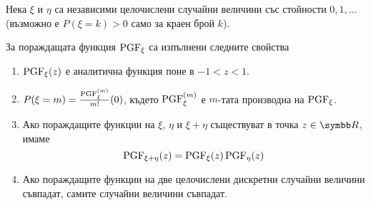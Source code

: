 \documentclass[numbers=endperiod, bibliography=totocnumbered]{scrartcl}
\begin{document}
\begin{theorem}\label{thm:pgf_properties}
  Нека \( \xi \) и \( \eta \) са независими целочислени случайни величини със стойности \( 0, 1, \ldots \) (възможно е \( P(\xi = k) > 0 \) само за краен брой \( k \)).

  За пораждащата функция \( \operatorname{PGF}_\xi \) са изпълнени следните свойства
  \begin{enumerate}
    \item \( \operatorname{PGF}_\xi(z) \) е аналитична функция поне в \( -1 < z < 1 \).
    \item \( P(\xi = m) = \frac {\operatorname{PGF}_\xi^{(m)}} {m!} (0) \), където \( \operatorname{PGF}_\xi^{(m)} \) е \( m \)-тата производна на \( \operatorname{PGF}_\xi \).
    \item Ако пораждащите функции на \( \xi \), \( \eta \) и \( \xi + \eta \) съществуват в точка \( z \in \R \), имаме
    \begin{equation*}
      \operatorname{PGF}_{\xi + \eta}(z) = \operatorname{PGF}_\xi(z) \operatorname{PGF}_\eta(z)
    \end{equation*}

    \item Ако пораждащите функции на две целочислени дискретни случайни величини съвпадат, самите случайни величини съвпадат.
  \end{enumerate}
\end{theorem}
\end{document}
